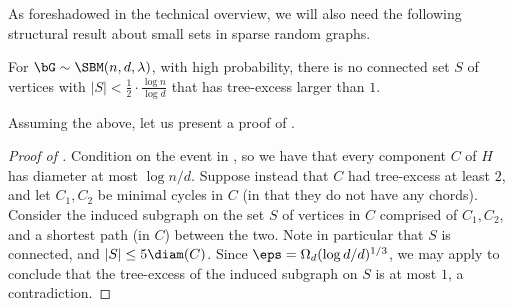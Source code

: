 \documentclass[11pt,letterpaper]{article}
\begin{document}
As foreshadowed in the technical overview, we will also need the following structural result about small sets in sparse random graphs.
\begin{lemma}
    \label{lem:small-subgraphs-have-excess-1}
    For $\bG\sim\SBM(n,d,\lambda)$, with high probability, there is no connected set $S$ of vertices with $|S| < \frac{1}{2} \cdot \frac{\log n}{\log d}$ that has tree-excess larger than $1$.
\end{lemma}
Assuming the above, let us present a proof of .

\begin{proof}[Proof of ]
    Condition on the event in , so we have that every component $C$ of $H$ has diameter at most $\log n/d$. Suppose instead that $C$ had tree-excess at least $2$, and let $C_1,C_2$ be minimal cycles in $C$ (in that they do not have any chords). Consider the induced subgraph on the set $S$ of vertices in $C$ comprised of $C_1,C_2$, and a shortest path (in $C$) between the two. Note in particular that $S$ is connected, and $|S| \le 5 \diam(C)$. Since $\eps = \Omega_d(\log d/d)^{1/3}$, we may apply  to conclude that the tree-excess of the induced subgraph on $S$ is at most $1$, a contradiction.
\end{proof}
\end{document}
